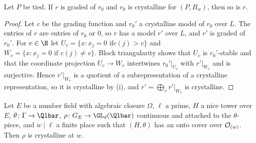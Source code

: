 \begin{lemma}\label{pf:steps1:grcrys}
Let $P$ be tied. If $r$ is graded of $r_0$ and $r_0$ is crystalline for $(P,B_w)$, then so is $r$.
 
\end{lemma}

\begin{proof}
Let $c$ be the grading function and $r_0'$ a crystalline model of $r_0$ over $L$. The entries of $r$ are entries of $r_0$
or $0$, so $r$ has a model $r'$ over $L$, and $r'$ is graded of $r_0'$. For $v\in\N$ let $U_v=\{x:x_j=0\text{ if
}c(j)>v\}$ and $W_v=\{x:x_j=0\text{ if }c(j)\ne v\}$. Block triangularity shows that $U_v$ is $r_0'$-stable and that the
coordinate projection $U_v\to W_v$ intertwines $r_0'|_{U_v}$ with $r'|_{W_v}$ and is surjective. Hence $r'|_{W_v}$ is a
quotient of a subrepresentation of a crystalline representation, so it is crystalline by (i), and
$r'=\bigoplus_vr'|_{W_v}$ is crystalline.
\end{proof}

\begin{theorem}\label{pf:steps1:crys}
Let $E$ be a number field with algebraic closure $\Omega$, $\ell$ a prime, $H$ a nice tower over $E$,
$\theta\colon\Gamma\to\Qlbar$, $\rho\colon G_E\to\GL_d(\Qlbar)$ continuous and attached to the $\theta$-piece, and $w\mid\ell$ a
finite place such that $(H,\theta)$ has an onto cover over $\mathcal{O}_{(w)}$. Then $\rho$ is crystalline at $w$.
 
\end{theorem}

